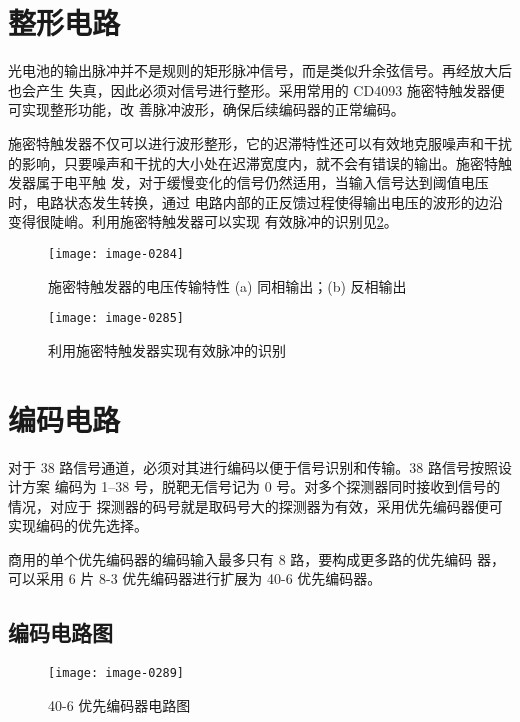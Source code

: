 \section{整形电路\cite{cn11}}

光电池的输出脉冲并不是规则的矩形脉冲信号，而是类似升余弦信号。再经放大后也会产生
失真，因此必须对信号进行整形。采用常用的 CD4093 施密特触发器便可实现整形功能，改
善脉冲波形，确保后续编码器的正常编码。

施密特触发器不仅可以进行波形整形，它的迟滞特性还可以有效地克服噪声和干扰的影响，只要噪声和干扰的大小处在迟滞宽度内，就不会有错误的输出。施密特触发器属于电平触
发，对于缓慢变化的信号仍然适用，当输入信号达到阈值电压时，电路状态发生转换，通过
电路内部的正反馈过程使得输出电压的波形的边沿变得很陡峭。利用施密特触发器可以实现
有效脉冲的识别见\cref{4-5}。

\begin{figure}[htbp]
  \centering
  \texttt{[image: image-0284]}
  \caption{施密特触发器的电压传输特性 (a) 同相输出；(b) 反相输出}
  \label{4-4}
\end{figure}

\begin{figure}[htbp]
  \centering
  \texttt{[image: image-0285]}
  \caption{利用施密特触发器实现有效脉冲的识别}
  \label{4-5}
\end{figure}

\section{编码电路\cite{cn11}}

对于 38 路信号通道，必须对其进行编码以便于信号识别和传输。38 路信号按照设计方案
编码为 1--38 号，脱靶无信号记为 0 号。对多个探测器同时接收到信号的情况，对应于
探测器的码号就是取码号大的探测器为有效，采用优先编码器便可实现编码的优先选择。

商用的单个优先编码器的编码输入最多只有 8 路，要构成更多路的优先编码
器，可以采用 6 片 8-3 优先编码器进行扩展为 40-6 优先编码器。

\subsection{编码电路图}

\newpage

\begin{figure}[htbp]
  \centering
  \texttt{[image: image-0289]}
  \caption{40-6 优先编码器电路图}
  \label{4-6}
\end{figure}

